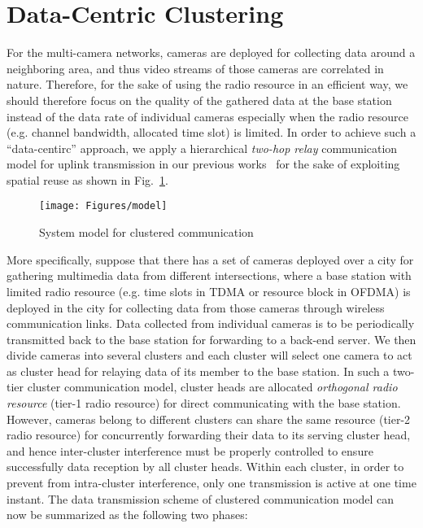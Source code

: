 \section{Data-Centric Clustering}
\label{sec::dcClustering}
%
For the multi-camera networks, cameras are deployed for collecting data around a neighboring area, and thus video streams of those cameras are correlated in nature.
Therefore, for the sake of using the radio resource in an efficient way, we should therefore focus on the quality of the gathered data at the base station instead of the data rate of individual cameras especially when the radio resource (e.g. channel bandwidth, allocated time slot) is limited.
In order to achieve such a ``data-centirc'' approach, we apply a hierarchical \emph{two-hop relay} communication model for uplink transmission in our previous works~\cite{steven} for the sake of exploiting spatial reuse as shown in Fig.~\ref{fig::dcModel}.
%
\begin{figure}
\centering
\texttt{[image: Figures/model]}
\caption{\label{fig::dcModel}System model for clustered communication}
\end{figure}
%
More specifically, suppose that there has a set of cameras deployed over a city for gathering multimedia data from different intersections, where a base station with limited radio resource (e.g. time slots in TDMA or resource block in OFDMA) is deployed in the city for collecting data from those cameras through wireless communication links.
Data collected from individual cameras is to be periodically transmitted back to the base station for forwarding to a back-end server.
We then divide cameras into several clusters and each cluster will select one camera to act as cluster head for relaying data of its member to the base station.
In such a two-tier cluster communication model, cluster heads are allocated \emph{orthogonal radio resource} (tier-1 radio resource) for direct communicating with the base station.
However, cameras belong to different clusters can share the same resource (tier-2 radio resource) for concurrently forwarding their data to its serving cluster head, and hence inter-cluster interference must be properly controlled to ensure successfully data reception by all cluster heads. 
Within each cluster, in order to prevent from intra-cluster interference, only one transmission is active at one time instant.
The data transmission scheme of clustered communication model can now be summarized as the following two phases:
